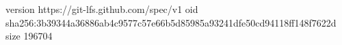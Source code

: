 version https://git-lfs.github.com/spec/v1
oid sha256:3b39344a36886ab4c9577c57e66b5d85985a93241dfe50cd94118ff148f7622d
size 196704
